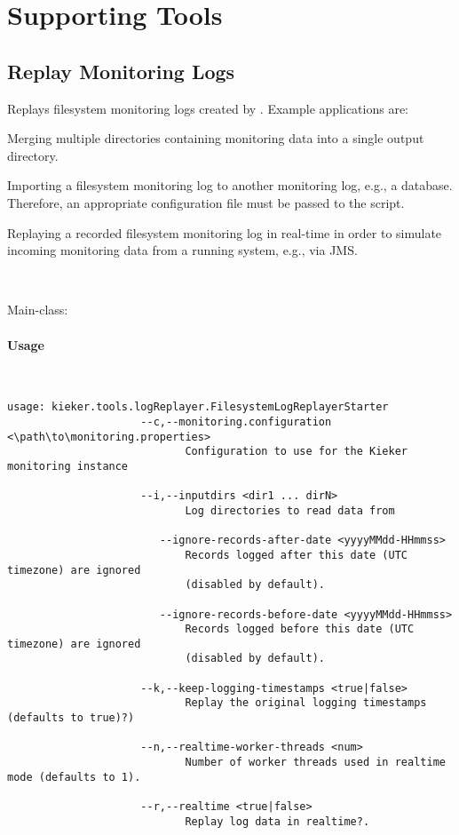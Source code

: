 	\section{Supporting Tools}
		\subsection{Replay Monitoring Logs}
		
			Replays filesystem monitoring logs created by \KiekerMonitoringPart{}. Example applications are:
			\begin{compactitem}
				\item 
				Merging multiple directories containing monitoring data into a single output directory. 
				\item 
				Importing a filesystem monitoring log to another monitoring log, e.g., a database. Therefore, an appropriate \KiekerMonitoringPart{} configuration	file must be passed to the script.
				\item 
				Replaying a recorded filesystem monitoring log in real-time in order to simulate incoming monitoring data from a running system, e.g., via JMS. 
			\end{compactitem}

			\

			\noindent Main-class: {\small {}}

			\paragraph*{Usage}\

				\setTextListing
				\begin{lstlisting}[gobble = 10]
					usage: kieker.tools.logReplayer.FilesystemLogReplayerStarter
					 --c,--monitoring.configuration <\path\to\monitoring.properties>
							Configuration to use for the Kieker monitoring instance

					 --i,--inputdirs <dir1 ... dirN>
							Log directories to read data from

						--ignore-records-after-date <yyyyMMdd-HHmmss>
							Records logged after this date (UTC timezone) are ignored
							(disabled by default).

						--ignore-records-before-date <yyyyMMdd-HHmmss>
							Records logged before this date (UTC timezone) are ignored
							(disabled by default).

					 --k,--keep-logging-timestamps <true|false>
							Replay the original logging timestamps (defaults to true)?)

					 --n,--realtime-worker-threads <num>
							Number of worker threads used in realtime mode (defaults to 1).

					 --r,--realtime <true|false>
							Replay log data in realtime?. 
				\end{lstlisting}


